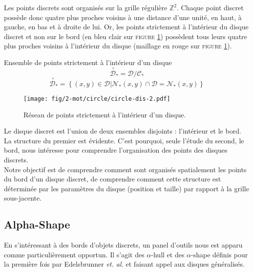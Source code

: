 Les points discrets sont organisés sur la grille régulière $\mathbb{Z}^{2}$. Chaque point discret possède donc quatre plus proches voisins à une distance d'une unité, en haut, à gauche, en bas et à droite de lui. Or, les points strictement à l'intérieur du disque discret et non sur le bord (en bleu clair sur \textsc{figure} \ref{fig:disque-bord}) possèdent tous leurs quatre plus proches voisins à l'intérieur du disque (maillage en rouge sur \textsc{figure} \ref{fig:disque-bord}).

\begin{Definition}{Ensemble de points strictement à l'intérieur d'un disque}
\label{def:int-ens}
  $$\stackrel{\ \circ}{\mathcal{D}}_{*} = \mathcal{D} / \mathcal{C_{*}} $$
  $$ \stackrel{\ \circ}{\mathcal{D}}_{*} =  \left\{ (x,y) \in \mathcal{D} | \mathcal{N}_{*}(x,y) \cap \mathcal{D} = \mathcal{N}_{*}(x,y) \right\}$$
\end{Definition}

\begin{figure}[H]
  \centering
  \texttt{[image: fig/2-mot/circle/circle-dis-2.pdf]}
  \caption{Réseau de points strictement à l'intérieur d'un disque.}
\label{fig:disque-bord}
\end{figure}

Le disque discret est l'union de deux ensembles disjoints : l'intérieur et le bord. La structure du premier est évidente. C'est pourquoi, seule l'étude du second, le bord, nous intéresse pour comprendre l'organisation des points des disques discrets.\\

Notre objectif est de comprendre comment sont organisés spatialement les points du bord d'un disque discret, de comprendre comment cette structure est déterminée par les paramètres du disque (position et taille) par rapport à la grille sous-jacente.   

\subsection{Alpha-Shape}

En s'intéressant à des bords d'objets discrets, un panel d'outils nous est apparu comme particulièrement opportun. Il s'agit des $\alpha$-hull et des $\alpha$-shape définis pour la première fois par Edelsbrunner \emph{et. al.} \cite{EdeKirSei83} et faisant appel aux disques généralisés.\\

